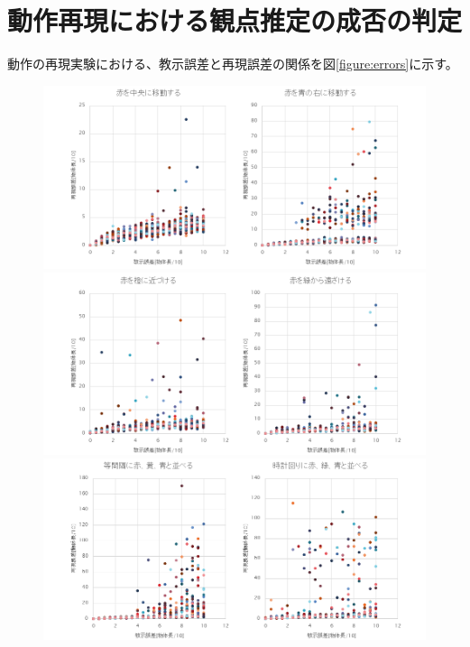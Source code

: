 ﻿\appendix
\chapter{動作再現における観点推定の成否の判定}\label{appendix1}

動作の再現実験における、教示誤差と再現誤差の関係を図\ref{figure:errors}に示す。
	\begin{figure}
		\begin{center}
			\includegraphics[width=15.5cm]{chart6.png} \\ %
			\includegraphics[width=15.5cm]{chart7.png} \\ %
			\includegraphics[width=15.5cm]{chart8.png} \\ %

\end{center}
\end{figure}
